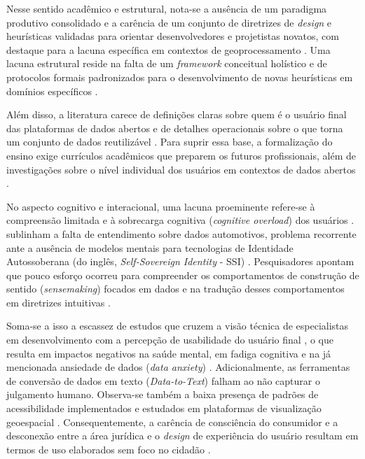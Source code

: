\documentclass[
	12pt,				%
	oneside,			%
	a4paper,			%
	english,			%
	brazil				%
	]{abntex2ppgsi}
\begin{document}
    Nesse sentido acadêmico e estrutural, nota-se a ausência de um paradigma produtivo consolidado e a carência de um conjunto de diretrizes de \textit{design} e heurísticas validadas para orientar desenvolvedores e projetistas novatos, com destaque para a lacuna específica em contextos de geoprocessamento \cite{Capeleti2024Human, Belizario2023Interacao, chalhoub2024useful, Zou2020769, Victorelli2020Human}. Uma lacuna estrutural reside na falta de um \textit{framework} conceitual holístico e de protocolos formais padronizados para o desenvolvimento de novas heurísticas em domínios específicos \cite{Capeleti2024Human, Strey2019Human, barcellos2022towards, Hornung2015, Elhamdadi2022, Roberts2017343}. 

    Além disso, a literatura carece de definições claras sobre quem é o usuário final das plataformas de dados abertos e de detalhes operacionais sobre o que torna um conjunto de dados reutilizável \cite{Belizario2023Interacao, koesten2021talking, Koesten2020}. Para suprir essa base, a formalização do ensino exige currículos acadêmicos que preparem os futuros profissionais, além de investigações sobre o nível individual dos usuários em contextos de dados abertos \cite{mu2024institutional, coleti2024human, Locoro2020}.

    No aspecto cognitivo e interacional, uma lacuna proeminente refere-se à compreensão limitada e à sobrecarga cognitiva (\textit{cognitive overload}) dos usuários \cite{Locoro2020}.  sublinham a falta de entendimento sobre dados automotivos, problema recorrente ante a ausência de modelos mentais para tecnologias de Identidade Autossoberana (do inglês, \textit{Self-Sovereign Identity} - SSI) \cite{Lockwood2021, Lockwood2020AnAccessible}. Pesquisadores apontam que pouco esforço ocorreu para compreender os comportamentos de construção de sentido (\textit{sensemaking}) focados em dados e na tradução desses comportamentos em diretrizes intuitivas \cite{koesten2021talking, Xiao2021, Koesten2021}. 

    Soma-se a isso a escassez de estudos que cruzem a visão técnica de especialistas em desenvolvimento com a percepção de usabilidade do usuário final \cite{Capeleti2024Human}, o que resulta em impactos negativos na saúde mental, em fadiga cognitiva e na já mencionada ansiedade de dados (\textit{data anxiety}) \cite{cezar2023cognitive}. Adicionalmente, as ferramentas de conversão de dados em texto (\textit{Data-to-Text}) falham ao não capturar o julgamento humano. Observa-se também a baixa presença de padrões de acessibilidade implementados e estudados em plataformas de visualização geoespacial \cite{Capeleti2024Human, ferreira2024connecting, Haghighati2020, Koesten2020Everything, JoseViterbo2020}. Consequentemente, a carência de consciência do consumidor e a desconexão entre a área jurídica e o \textit{design} de experiência do usuário resultam em termos de uso elaborados sem foco no cidadão \cite{Coleti2019DesigPatterns, Jones2017, Mashhadi2014}.
\end{document}
